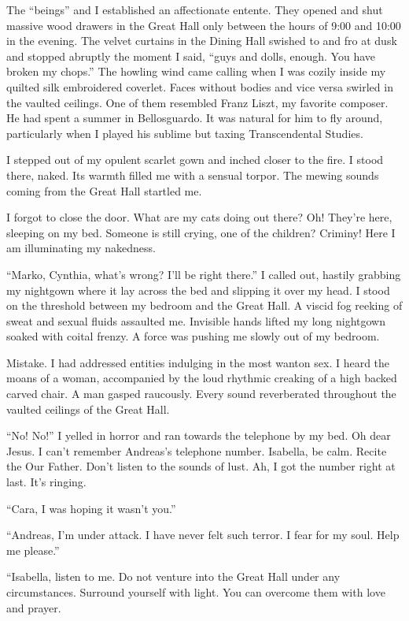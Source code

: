 The ``beings'' and I established an affectionate entente. They opened and shut massive wood drawers in the Great Hall only between the hours of 9:00 and 10:00 in the evening. The velvet curtains in the Dining Hall swished to and fro at dusk and stopped abruptly the moment I said, ``guys and dolls, enough. You have broken my chops.'' The howling wind came calling when I was cozily inside my quilted silk embroidered coverlet. Faces without bodies and vice versa swirled in the vaulted ceilings. One of them resembled Franz Liszt, my favorite composer. He had spent a summer in Bellosguardo. It was natural for him to fly around, particularly when I played his sublime but taxing Transcendental Studies.

I stepped out of my opulent scarlet gown and inched closer to the fire. I stood there, naked. Its warmth filled me with a sensual torpor. The mewing sounds coming from the Great Hall startled me.

I forgot to close the door. What are my cats doing out there? Oh! They’re here, sleeping on my bed. Someone is still crying, one of the children? Criminy!  Here I am illuminating my nakedness.

``Marko, Cynthia, what’s wrong? I’ll be right there.'' I called out, hastily grabbing my nightgown where it lay across the bed and slipping it over my head. I stood on the threshold between my bedroom and the Great Hall. A viscid fog reeking of sweat and sexual fluids assaulted me. Invisible hands lifted my long nightgown soaked with coital frenzy. A force was pushing me slowly out of my bedroom.

Mistake. I had addressed entities indulging in the most wanton sex. I heard the moans of a woman, accompanied by the loud rhythmic creaking of a high backed carved chair. A man gasped raucously. Every sound reverberated throughout the vaulted ceilings of the Great Hall.

``No! No!'' I yelled in horror and ran towards the telephone by my bed. Oh dear Jesus. I can’t remember Andreas’s telephone number. Isabella, be calm. Recite the Our Father. Don’t listen to the sounds of lust. Ah, I got the number right at last. It’s ringing.

``Cara, I was hoping it wasn’t you.''

``Andreas, I’m under attack. I have never felt such terror. I fear for my soul. Help me please.''

``Isabella, listen to me. Do not venture into the Great Hall under any circumstances. Surround yourself with light. You can overcome them with love and prayer.

